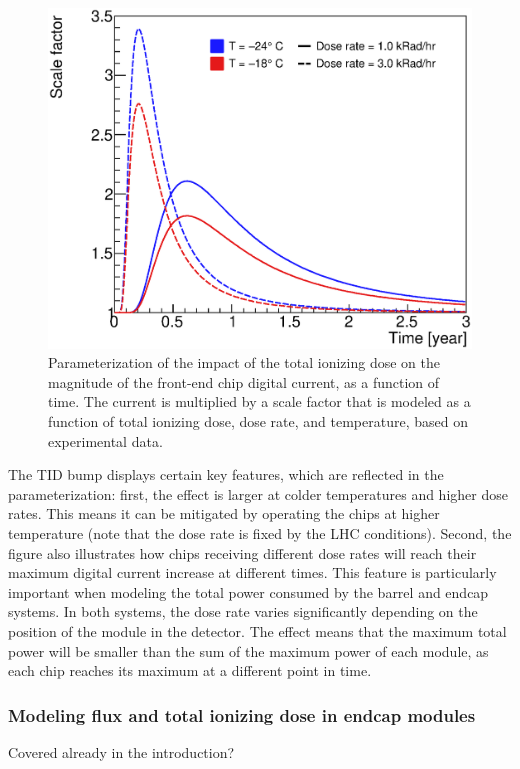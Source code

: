 \begin{figure}[ht]
\centering
\includegraphics[width=0.5\linewidth]{figures/AbcTidBumpVersionRatesAndTemps_Nominal.eps}
\caption{Parameterization of the impact of the total ionizing dose
on the magnitude of the front-end chip digital current, as a function of time.
The current is multiplied by a scale factor that is modeled as a function of total ionizing dose,
dose rate, and temperature, based on experimental data.
}
\label{tid_bump}
\end{figure}

The TID bump displays certain key features, which are reflected in the parameterization:
first, the effect is larger at colder temperatures and higher dose rates. This means it can be
mitigated by operating the chips at higher temperature (note that the dose rate is fixed by the LHC conditions).
Second, the figure also illustrates how chips receiving different dose rates will reach their maximum
digital current increase at different times. This feature is particularly important when modeling the
total power consumed by the barrel and endcap systems. In both systems, the dose rate varies significantly
depending on the position of the module in the detector. The effect means that the maximum total
power will be smaller than the sum of the maximum power of each module, as each chip reaches
its maximum at a different point in time.

\subsubsection{Modeling flux and total ionizing dose in endcap modules}

Covered already in the introduction?

